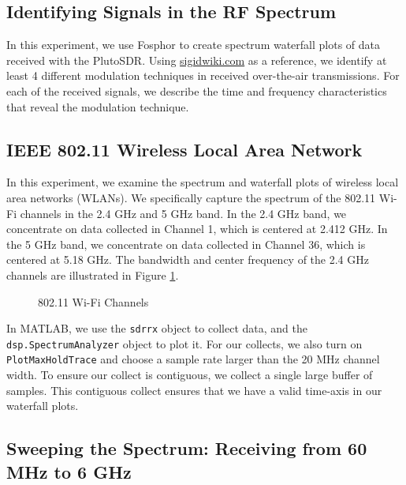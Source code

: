 \documentclass{article}
\begin{document}
\subsection{Identifying Signals in the RF Spectrum}

In this experiment, we use Fosphor to create spectrum waterfall plots of data received with the PlutoSDR. Using \url{sigidwiki.com} as a reference, we identify at least 4 different modulation techniques in received over-the-air transmissions. For each of the received signals, we describe the time and frequency characteristics that reveal the modulation technique.

\subsection{IEEE 802.11 Wireless Local Area Network}

In this experiment, we examine the spectrum and waterfall plots of wireless local area networks (WLANs). We specifically capture the spectrum of the 802.11 Wi-Fi channels in the 2.4 GHz and 5 GHz band. In the 2.4 GHz band, we concentrate on data collected in Channel 1, which is centered at 2.412 GHz. In the 5 GHz band, we concentrate on data collected in Channel 36, which is centered at 5.18 GHz. The bandwidth and center frequency of the 2.4 GHz channels are illustrated in Figure \ref{fig::802_11_channels}.

\begin{figure}[H]
	\centerline{}
	\caption{802.11 Wi-Fi Channels}
	\label{fig::802_11_channels}
\end{figure}

In MATLAB, we use the \texttt{sdrrx} object to collect data, and the \texttt{dsp.SpectrumAnalyzer} object to plot it. For our collects, we also turn on \texttt{PlotMaxHoldTrace} and choose a sample rate larger than the 20 MHz channel width. To ensure our collect is contiguous, we collect a single large buffer of samples. This contiguous collect ensures that we have a valid time-axis in our waterfall plots.
 
\subsection{Sweeping the Spectrum: Receiving from 60 MHz to 6 GHz}
\end{document}
